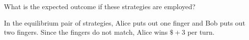 \documentclass[11pt, reqno]{amsart}
\begin{document}
\begin{problem}[7]
\begin{enumalph}
      \medskip
    \item What is the expected outcome if these strategies are employed?
    
      \step
      In the equilibrium pair of strategies, Alice puts out one finger
      and Bob puts out two fingers.
      Since the fingers do not match, Alice wins $\$+3$ per turn.
  \end{enumalph}


  
\end{problem}
\end{document}
